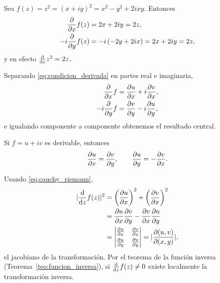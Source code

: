 \begin{ejemplo}
  \label{ej:z_cuadrado_derivada}
  Sea $f(z)=z^2=(x+iy)^2=x^2-y^2+2ixy$. Entonces
  \begin{equation}
    \label{eq:z2_derivadas}
    \begin{aligned}
      \frac{\partial }{\partial x}f(z)&=2x+2iy=2z,\\
      -i\frac{\partial }{\partial y}f(z)&=-i\left( -2y+2ix \right)=2x+2iy=2z,
    \end{aligned}
  \end{equation}
  y en efecto $\frac{\mathrm{d}}{\mathrm{d}z}z^2=2z$.
\end{ejemplo}

Separando \eqref{eq:condicion_derivada} en partes real e imaginaria,
\begin{equation}
  \label{eq:cr_desarrollo}
  \begin{aligned}
    \frac{\partial }{\partial x}f&=\frac{\partial u}{\partial x}+i\frac{\partial v}{\partial x},\\
    -i\frac{\partial }{\partial y}f&=\frac{\partial v}{\partial y}-i\frac{\partial u}{\partial y},
  \end{aligned}
\end{equation}
e igualando componente a componente obtenemos el resultado central.

\begin{teorema}
  \label{teo:cauchy_riemann}
  Si $f=u+iv$ es derivable, entonces
  \begin{equation}
    \label{eq:cauchy_riemann}
    \frac{\partial u}{\partial x}=\frac{\partial v}{\partial y},
    \qquad
    \frac{\partial u}{\partial y}=-\frac{\partial v}{\partial x} .
  \end{equation}
\end{teorema}

\begin{observacion}
  \label{obs:jacobiano_cr}
  Usando \eqref{eq:cauchy_riemann},
  \begin{equation}
    \label{eq:modulo_derivada}
    \begin{aligned}
      \lvert \frac{\mathrm{d}}{\mathrm{d}z}f(z) \rvert^2
        &=\left( \frac{\partial u}{\partial x} \right)^2+\left( \frac{\partial v}{\partial x} \right)^2\\
        &=\frac{\partial u}{\partial x}\frac{\partial v}{\partial y}-\frac{\partial v}{\partial x}\frac{\partial u}{\partial y}\\
        &=
        \begin{vmatrix}
          \frac{\partial u}{\partial x} & \frac{\partial v}{\partial x}\\[3pt]
          \frac{\partial u}{\partial y} & \frac{\partial v}{\partial y}
        \end{vmatrix}
        =\lvert \frac{\partial(u,v)}{\partial(x,y)} \rvert ,
    \end{aligned}
  \end{equation}
  el jacobiano de la transformaci\'on. Por el teorema de la funci\'on inversa
  (Teorema~\ref{teo:funcion_inversa}), si $\frac{\mathrm{d}}{\mathrm{d}z}f(z)\neq 0$ existe
  localmente la transformaci\'on inversa.
\end{observacion}

